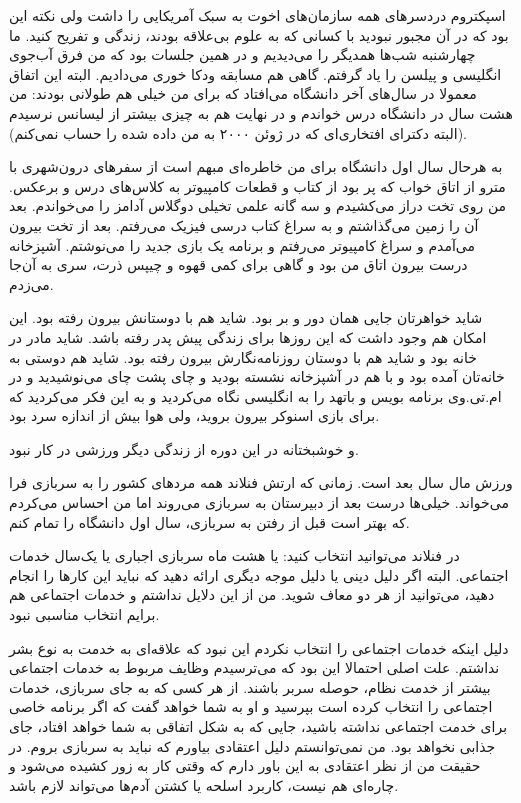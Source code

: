 اسپکتروم دردسرهای همه سازمان‌های اخوت به سبک آمریکایی را داشت ولی نکته
این بود که در آن مجبور نبودید با کسانی که به علوم بی‌علاقه بودند، زندگی
و تفریح کنید. ما چهارشنبه‌ شب‌ها همدیگر را می‌دیدیم و در همین جلسات بود
که من فرق آب‌جوی انگلیسی و پیلسن را یاد گرفتم. گاهی هم مسابقه ودکا خوری
می‌دادیم. البته این اتفاق معمولا در سال‌های آخر دانشگاه می‌افتاد که برای
من خیلی هم طولانی بودند: من هشت سال در دانشگاه درس خواندم و در نهایت
هم به چیزی بیشتر از لیسانس نرسیدم (البته دکترای افتخاری‌ای که در ژوئن
۲۰۰۰ به من داده شده را حساب نمی‌کنم).

به هرحال سال اول دانشگاه برای من خاطره‌ای مبهم است از سفرهای درون‌شهری
با مترو از اتاق خواب که پر بود از کتاب و قطعات کامپیوتر به کلاس‌های درس
و برعکس. من روی تخت دراز می‌کشیدم و سه گانه علمی تخیلی دوگلاس
آدامز را
می‌خواندم. بعد آن را زمین می‌گذاشتم و به سراغ کتاب درسی فیزیک
می‌رفتم. بعد از تخت بیرون می‌آمدم و سراغ کامپیوتر می‌رفتم و برنامه یک
بازی جدید را می‌نوشتم. آشپزخانه درست بیرون اتاق من بود و گاهی برای کمی
قهوه و چیپس ذرت، سری به آن‌جا می‌زدم.

شاید خواهرتان جایی همان دور و بر بود. شاید هم با دوستانش بیرون رفته
بود. این امکان هم وجود داشت که این روزها برای زندگی پیش پدر رفته
باشد. شاید مادر در خانه بود و شاید هم با دوستان روزنامه‌نگارش بیرون
رفته بود. شاید هم دوستی به خانه‌تان آمده بود و با هم در آشپزخانه نشسته
بودید و چای پشت چای می‌نوشیدید و در ام.تی.وی برنامه بویس و
باتهد را به انگلیسی نگاه می‌کردید و به
این فکر می‌کردید که برای بازی اسنوکر بیرون بروید، ولی هوا بیش از اندازه
سرد بود.

و خوشبختانه در این دوره از زندگی دیگر ورزشی در کار نبود.

ورزش مال سال بعد است. زمانی که ارتش فنلاند همه مردهای کشور را به
سربازی فرا می‌خواند. خیلی‌ها درست بعد از دبیرستان به سربازی می‌روند اما
من احساس می‌کردم که بهتر است قبل از رفتن به سربازی، سال اول دانشگاه را
تمام کنم.

در فنلاند می‌توانید انتخاب کنید: یا هشت ماه سربازی اجباری یا یک‌سال
خدمات اجتماعی. البته اگر دلیل دینی یا دلیل موجه دیگری ارائه دهید که
نباید این کارها را انجام دهید، می‌توانید از هر دو معاف شوید. من از این
دلایل نداشتم و خدمات اجتماعی هم برایم انتخاب مناسبی نبود.

دلیل اینکه خدمات اجتماعی را انتخاب نکردم این نبود که علاقه‌ای به خدمت
به نوع بشر نداشتم. علت اصلی احتمالا این بود که می‌ترسیدم وظایف مربوط به
خدمات اجتماعی بیشتر از خدمت نظام، حوصله سربر باشند. از هر کسی که به
جای سربازی،‌ خدمات اجتماعی را انتخاب کرده است بپرسید و او به شما خواهد
گفت که اگر برنامه خاصی برای خدمت اجتماعی نداشته باشید، جایی که به شکل
اتفاقی به شما خواهد افتاد، جای جذابی نخواهد بود. من نمی‌توانستم دلیل
اعتقادی بیاورم که نباید به سربازی بروم. در حقیقت من از نظر اعتقادی به
این باور دارم که وقتی کار به زور کشیده می‌شود و چاره‌ای هم نیست، کاربرد
اسلحه یا کشتن آدم‌ها می‌تواند لازم باشد.


